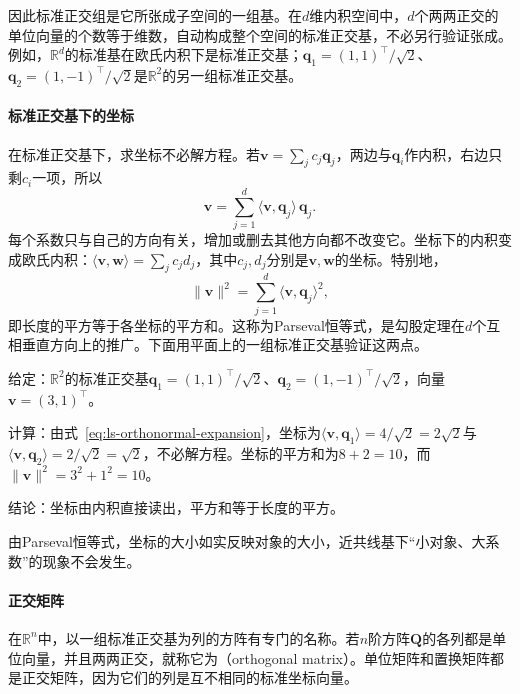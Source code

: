 因此标准正交组是它所张成子空间的一组基。在$d$维内积空间中，$d$个两两正交的单位向量的个数等于维数，自动构成整个空间的标准正交基，不必另行验证张成。例如，$\mathbb R^d$的标准基在欧氏内积下是标准正交基；$\bm q_1=(1,1)^\top/\sqrt2$、$\bm q_2=(1,-1)^\top/\sqrt2$是$\mathbb R^2$的另一组标准正交基。

\paragraph{标准正交基下的坐标}
在标准正交基下，求坐标不必解方程。若$\bm v=\sum_jc_j\bm q_j$，两边与$\bm q_i$作内积，右边只剩$c_i$一项，所以
\begin{equation}
 \bm v=\sum_{j=1}^d\langle\bm v,\bm q_j\rangle\,\bm q_j.
 \label{eq:ls-orthonormal-expansion}
\end{equation}
每个系数只与自己的方向有关，增加或删去其他方向都不改变它。坐标下的内积变成欧氏内积：$\langle\bm v,\bm w\rangle=\sum_jc_jd_j$，其中$c_j,d_j$分别是$\bm v,\bm w$的坐标。特别地，
\begin{equation}
 \lVert\bm v\rVert^2=\sum_{j=1}^d\langle\bm v,\bm q_j\rangle^2,
 \label{eq:ls-parseval}
\end{equation}
即长度的平方等于各坐标的平方和。这称为Parseval恒等式，是勾股定理在$d$个互相垂直方向上的推广。下面用平面上的一组标准正交基验证这两点。
\begin{example}[标准正交基下的坐标与Parseval恒等式]
\label{ex:ls-orthonormal-coordinates}
给定：$\mathbb R^2$的标准正交基$\bm q_1=(1,1)^\top/\sqrt2$、$\bm q_2=(1,-1)^\top/\sqrt2$，向量$\bm v=(3,1)^\top$。

计算：由式~\eqref{eq:ls-orthonormal-expansion}，坐标为$\langle\bm v,\bm q_1\rangle=4/\sqrt2=2\sqrt2$与$\langle\bm v,\bm q_2\rangle=2/\sqrt2=\sqrt2$，不必解方程。坐标的平方和为$8+2=10$，而$\lVert\bm v\rVert^2=3^2+1^2=10$。

结论：坐标由内积直接读出，平方和等于长度的平方。
\end{example}
由Parseval恒等式，坐标的大小如实反映对象的大小，近共线基下“小对象、大系数”的现象不会发生。

\paragraph{正交矩阵}
\label{sec:ls-orthogonal-matrices}
在$\mathbb R^n$中，以一组标准正交基为列的方阵有专门的名称。若$n$阶方阵$\bm Q$的各列都是单位向量，并且两两正交，就称它为（orthogonal matrix）。单位矩阵和置换矩阵都是正交矩阵，因为它们的列是互不相同的标准坐标向量。


